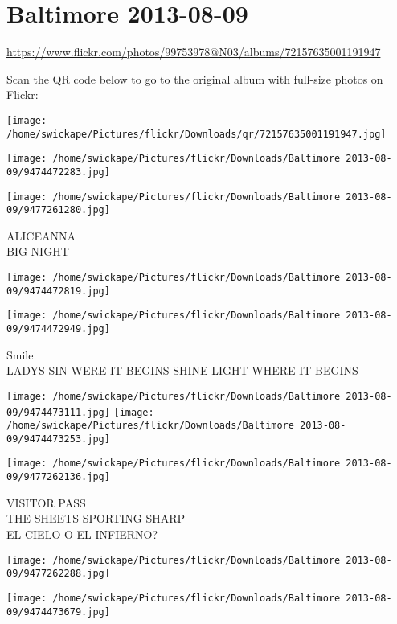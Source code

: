 \documentclass[10pt,letterpaper]{article}
\title{}
\author{}
\date{}
\begin{document}
\section*{Baltimore 2013-08-09}

\url{https://www.flickr.com/photos/99753978@N03/albums/72157635001191947}

Scan the QR code below to go to the original album with full-size photos on Flickr:

\texttt{[image: /home/swickape/Pictures/flickr/Downloads/qr/72157635001191947.jpg]}
\pagebreak

\texttt{[image: /home/swickape/Pictures/flickr/Downloads/Baltimore 2013-08-09/9474472283.jpg]}

\vspace{0.25in}
\texttt{[image: /home/swickape/Pictures/flickr/Downloads/Baltimore 2013-08-09/9477261280.jpg]}

ALICEANNA\\
BIG NIGHT
\pagebreak

\texttt{[image: /home/swickape/Pictures/flickr/Downloads/Baltimore 2013-08-09/9474472819.jpg]}

\vspace{0.25in}
\texttt{[image: /home/swickape/Pictures/flickr/Downloads/Baltimore 2013-08-09/9474472949.jpg]}

Smile\\
LADYS SIN WERE IT BEGINS SHINE LIGHT WHERE IT BEGINS
\pagebreak

\texttt{[image: /home/swickape/Pictures/flickr/Downloads/Baltimore 2013-08-09/9474473111.jpg]}
\texttt{[image: /home/swickape/Pictures/flickr/Downloads/Baltimore 2013-08-09/9474473253.jpg]}

\texttt{[image: /home/swickape/Pictures/flickr/Downloads/Baltimore 2013-08-09/9477262136.jpg]}

VISITOR PASS\\
THE SHEETS SPORTING SHARP\\
EL CIELO O EL INFIERNO?
\pagebreak

\texttt{[image: /home/swickape/Pictures/flickr/Downloads/Baltimore 2013-08-09/9477262288.jpg]}

\vspace{0.25in}
\texttt{[image: /home/swickape/Pictures/flickr/Downloads/Baltimore 2013-08-09/9474473679.jpg]}
\end{document}
